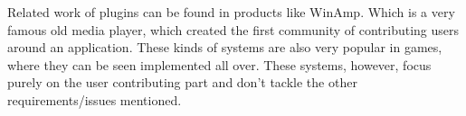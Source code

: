 Related work of plugins can be found in products like WinAmp. Which is a very famous old media player, which created the first community of contributing users around an application. These kinds of systems are also very popular in games, where they can be seen implemented all over. These systems, however, focus purely on the user contributing part and don't tackle the other requirements/issues mentioned. 

